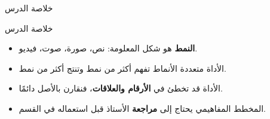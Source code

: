 \documentclass[aspectratio=169, 11pt, xcolor={table}]{beamer}
\begin{document}
\begin{frame}{خلاصة الدرس}
    \begin{tbox}{\faCheckCircle\quad خلاصة الدرس}
        \begin{itemize}
            \item \textbf{النمط} هو شكل المعلومة: نص، صورة، صوت، فيديو.
            \item الأداة متعددة الأنماط تفهم أكثر من نمط وتنتج أكثر من نمط.
            \item الأداة قد تخطئ في \textbf{الأرقام والعلاقات}، فنقارن بالأصل دائمًا.
            \item المخطط المفاهيمي يحتاج إلى \textbf{مراجعة} الأستاذ قبل استعماله في القسم.
        \end{itemize}
    \end{tbox}
\end{frame}
\end{document}

